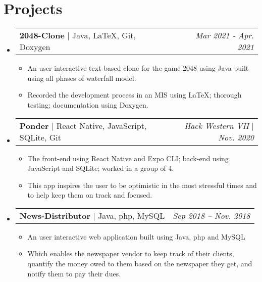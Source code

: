 \documentclass[letterpaper,11pt]{article}
\makeatletter
\newcommand{\resumeItem}[1]{
  \item\small{
    {#1 \vspace{-2pt}}
  }
}
\newcommand{\resumeProjectHeading}[2]{
    \item
    \begin{tabular*}{0.97\textwidth}{l@{\extracolsep{\fill}}r}
      \small#1 & #2 \\
    \end{tabular*}\vspace{-7pt}
}
\newcommand{\resumeSubHeadingListStart}{\begin{itemize}[leftmargin=0.15in, label={}]}
\newcommand{\resumeSubHeadingListEnd}{\end{itemize}}
\newcommand{\resumeItemListStart}{\begin{itemize}}
\newcommand{\resumeItemListEnd}{\end{itemize}\vspace{-5pt}}
\makeatother
\begin{document}
\section{Projects}
    \resumeSubHeadingListStart
      \resumeProjectHeading
          {\textbf{2048-Clone} $|$ \small{Java, \LaTeX, Git, Doxygen}}{\small \textit{Mar 2021 - Apr. 2021}}
          \resumeItemListStart
            \resumeItem{An user interactive text-based clone for the game 2048 using Java built using all phases of waterfall model.}
            \resumeItem{Recorded the development process in an MIS using \LaTeX; thorough testing; documentation using Doxygen.}
          \resumeItemListEnd
      \resumeProjectHeading
          {\textbf{Ponder} $|$ \small{React Native, JavaScript, SQLite, Git}}{\small \textit{Hack Western VII $|$ Nov. 2020}}
          \resumeItemListStart
            \resumeItem{The front-end using React Native and Expo CLI; back-end using JavaScript and SQLite; worked in a group of 4.}
            \resumeItem{This app inspires the user to be optimistic in the most stressful times and to help keep them on track and focused.}
          \resumeItemListEnd
      \resumeProjectHeading
          {\textbf{News-Distributor} $|$ \small{Java, php, MySQL}}{\small \textit{Sep 2018 -- Nov. 2018}}
          \resumeItemListStart
            \resumeItem{An user interactive web application built using Java, php and MySQL}
            \resumeItem{Which enables the newspaper vendor to keep track of their clients, quantify the money owed to them based on the newspaper they get, and notify them to pay their dues.}
          \resumeItemListEnd
      
    \resumeSubHeadingListEnd

\end{document}
